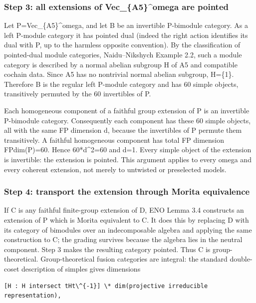 \hypertarget{step-3-all-extensions-of-vec_a5omega-are-pointed}{%
\subsubsection{Step 3: all extensions of Vec\_\{A5\}\^{}omega are
pointed}\label{step-3-all-extensions-of-vec_a5omega-are-pointed}}

Let P=Vec\_\{A5\}\^{}omega, and let B be an invertible P-bimodule
category. As a left P-module category it has pointed dual (indeed the
right action identifies its dual with P, up to the harmless opposite
convention). By the classification of pointed-dual module categories,
Naidu--Nikshych Example 2.2, such a module category is described by a
normal abelian subgroup H of A5 and compatible cochain data. Since A5
has no nontrivial normal abelian subgroup, H=\{1\}. Therefore B is the
regular left P-module category and has 60 simple objects, transitively
permuted by the 60 invertibles of P.

Each homogeneous component of a faithful group extension of P is an
invertible P-bimodule category. Consequently each component has these 60
simple objects, all with the same FP dimension d, because the
invertibles of P permute them transitively. A faithful homogeneous
component has total FP dimension FPdim(P)=60. Hence 60*d\^{}2=60 and
d=1. Every simple object of the extension is invertible: the extension
is pointed. This argument applies to every omega and every coherent
extension, not merely to untwisted or preselected models.

\hypertarget{step-4-transport-the-extension-through-morita-equivalence}{%
\subsubsection{Step 4: transport the extension through Morita
equivalence}\label{step-4-transport-the-extension-through-morita-equivalence}}

If C is any faithful finite-group extension of D, ENO Lemma 3.4
constructs an extension of P which is Morita equivalent to C. It does
this by replacing D with its category of bimodules over an
indecomposable algebra and applying the same construction to C; the
grading survives because the algebra lies in the neutral component. Step
3 makes the resulting category pointed. Thus C is group-theoretical.
Group-theoretical fusion categories are integral: the standard
double-coset description of simples gives dimensions

\begin{verbatim}
[H : H intersect tHt\^{-1}] \* dim(projective irreducible representation),
\end{verbatim}

